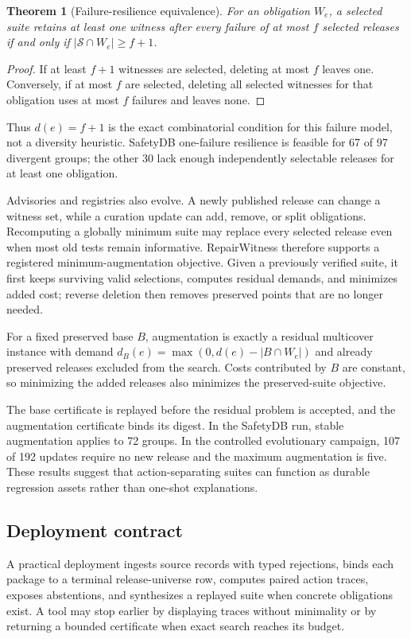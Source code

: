 \documentclass[10pt,conference]{IEEEtran}
\newtheorem{theorem}{Theorem}
\newcommand{\Suit}{\mathcal{S}}
\begin{document}
\begin{theorem}[Failure-resilience equivalence]
For an obligation $W_e$, a selected suite retains at least one witness after every failure of at most $f$ selected releases if and only if $|\Suit\cap W_e|\geq f+1$.
\end{theorem}
\begin{proof}
If at least $f+1$ witnesses are selected, deleting at most $f$ leaves one. Conversely, if at most $f$ are selected, deleting all selected witnesses for that obligation uses at most $f$ failures and leaves none.
\end{proof}

Thus $d(e)=f+1$ is the exact combinatorial condition for this failure model, not a diversity heuristic. SafetyDB one-failure resilience is feasible for 67 of 97 divergent groups; the other 30 lack enough independently selectable releases for at least one obligation.

Advisories and registries also evolve. A newly published release can change a witness set, while a curation update can add, remove, or split obligations. Recomputing a globally minimum suite may replace every selected release even when most old tests remain informative. RepairWitness therefore supports a registered minimum-augmentation objective. Given a previously verified suite, it first keeps surviving valid selections, computes residual demands, and minimizes added cost; reverse deletion then removes preserved points that are no longer needed.

For a fixed preserved base $B$, augmentation is exactly a residual multicover instance with demand $d_B(e)=\max(0,d(e)-|B\cap W_e|)$ and already preserved releases excluded from the search. Costs contributed by $B$ are constant, so minimizing the added releases also minimizes the preserved-suite objective.

The base certificate is replayed before the residual problem is accepted, and the augmentation certificate binds its digest. In the SafetyDB run, stable augmentation applies to 72 groups. In the controlled evolutionary campaign, 107 of 192 updates require no new release and the maximum augmentation is five. These results suggest that action-separating suites can function as durable regression assets rather than one-shot explanations.

\subsection{Deployment contract}
A practical deployment ingests source records with typed rejections, binds each package to a terminal release-universe row, computes paired action traces, exposes abstentions, and synthesizes a replayed suite when concrete obligations exist. A tool may stop earlier by displaying traces without minimality or by returning a bounded certificate when exact search reaches its budget.
\end{document}
